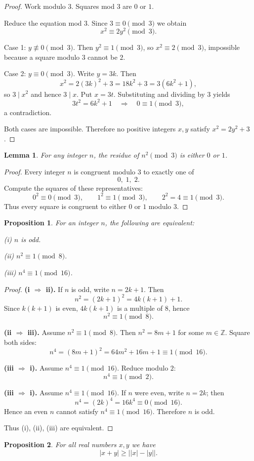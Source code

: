 \documentclass{article}
\theoremstyle{plain}
\newtheorem{lemma}{Lemma}
\newtheorem{proposition}{Proposition}
\theoremstyle{definition}
\theoremstyle{remark}
\begin{document}
\begin{proof}
Work modulo \(3\). Squares mod \(3\) are \(0\) or \(1\).

Reduce the equation mod \(3\). Since \(3\equiv0\pmod3\) we obtain
\[
x^2 \equiv 2y^2 \pmod3.
\]

Case 1: \(y\not\equiv 0\pmod3\). Then \(y^2\equiv1\pmod3\), so
\(x^2\equiv 2\pmod3\), impossible because a square modulo \(3\) cannot be \(2\).

Case 2: \(y\equiv 0\pmod3\). Write \(y=3k\). Then
\[
x^2 = 2(3k)^2+3 = 18k^2+3 = 3(6k^2+1),
\]
so \(3\mid x^2\) and hence \(3\mid x\). Put \(x=3t\). Substituting and
dividing by \(3\) yields
\[
3t^2 = 6k^2+1 \quad\Longrightarrow\quad 0\equiv 1\pmod3,
\]
a contradiction.

Both cases are impossible. Therefore no positive integers \(x,y\) satisfy
\(x^2=2y^2+3\).
\end{proof}
\begin{lemma}
For any integer $n$, the residue of $n^2 \pmod 3$ is either $0$ or $1$.
\end{lemma}

\begin{proof}
Every integer $n$ is congruent modulo $3$ to exactly one of
\[
0,\;1,\;2.
\]
Compute the squares of these representatives:
\[
0^2 \equiv 0 \pmod 3,\qquad
1^2 \equiv 1 \pmod 3,\qquad
2^2 = 4 \equiv 1 \pmod 3.
\]
Thus every square is congruent to either $0$ or $1$ modulo $3$.
\end{proof}
\begin{proposition}
For an integer $n$, the following are equivalent:

(i) $n$ is odd.

(ii) $n^2 \equiv 1 \pmod{8}$.

(iii) $n^4 \equiv 1 \pmod{16}$.
\end{proposition}

\begin{proof}
\textbf{(i $\Rightarrow$ ii).}
If $n$ is odd, write $n = 2k+1$. Then
\[
n^2 = (2k+1)^2 = 4k(k+1)+1.
\]
Since $k(k+1)$ is even, $4k(k+1)$ is a multiple of $8$, hence
\[
n^2 \equiv 1 \pmod{8}.
\]

\medskip
\textbf{(ii $\Rightarrow$ iii).}
Assume $n^2 \equiv 1 \pmod{8}$. Then $n^2 = 8m + 1$ for some $m\in\mathbb{Z}$.  
Square both sides:
\[
n^4 = (8m+1)^2 = 64m^2 + 16m + 1 \equiv 1 \pmod{16}.
\]

\medskip
\textbf{(iii $\Rightarrow$ i).}
Assume $n^4 \equiv 1 \pmod{16}$. Reduce modulo $2$:
\[
n^4 \equiv 1 \pmod 2.
\]

\textbf{(iii $\Rightarrow$ i).}
Assume $n^4\equiv 1\pmod{16}$. If $n$ were even, write $n=2k$; then
\[
n^4=(2k)^4=16k^4\equiv 0\pmod{16}.
\]
Hence an even $n$ cannot satisfy $n^4\equiv1\pmod{16}$. Therefore $n$ is odd.

\medskip
Thus (i), (ii), (iii) are equivalent.
\end{proof}
\begin{proposition}
For all real numbers \(x,y\) we have
\[
|x+y|\ge \bigl||x|-|y|\bigr|.
\]
\end{proposition}
\end{document}
